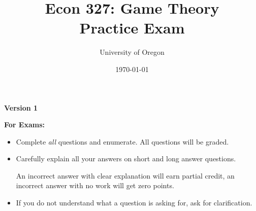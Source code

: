\documentclass{article}
\title{
    \textbf{Econ 327: Game Theory} \\ 
    Practice Exam
    }
\author{University of Oregon}
\date{\today}
\newcounter{questions}
\begin{document}

\maketitle

\begin{center}
  \Large{\textbf{Version 1}}
\end{center}



% 
% 
% 
% 
%  

\begin{center}
  \textbf{For Exams:}
\end{center}

\begin{itemize}
  
  \item Complete \textit{all} questions and enumerate. 
  All questions will be graded.

  \item Carefully explain all your answers on short and long answer questions.

  An incorrect answer with clear explanation will earn partial credit,
  an incorrect answer with no work will get zero points.

  \item 
  If you do not understand what a question is asking for, 
  ask for clarification. 

\end{itemize}
\end{document}

